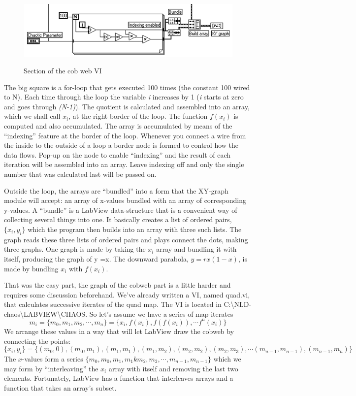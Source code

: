\documentclass{../lab}
\begin{document}
\begin{figure}[h]
    \centering
    \href{http://experimentationlab.berkeley.edu/sites/default/files/images/Nldimage082.gif}{\includegraphics[width=0.7\linewidth]{images/Nldimage082.png}}
    \caption{Section of the cob web VI}
    \label{fig:SectionOfCobWebVI}
\end{figure}

The big square is a for-loop that gets executed 100 times (the constant 100 wired to N). Each time through the loop the variable \emph{i} increases by 1 (\emph{i} starts at zero and goes through \emph{(N-1)}). The quotient is calculated and assembled into an array, which we shall call $x_i$, at the right border of the loop. The function $f(x_i)$ is computed and also accumulated. The array is accumulated by means of the ``indexing'' feature at the border of the loop. Whenever you connect a wire from the inside to the outside of a loop a border node is formed to control how the data flows. Pop-up on the node to enable ``indexing'' and the result of each iteration will be assembled into an array. Leave indexing off and only the single number that was calculated last will be passed on.

Outside the loop, the arrays are ``bundled'' into a form that the XY-graph module will accept: an array of x-values bundled with an array of corresponding y-values. A ``bundle'' is a LabView data-structure that is a convenient way of collecting several things into one. It basically creates a list of ordered pairs, $\{x_i,y_i\}$ which the program then builds into an array with three such lists. The graph reads these three lists of ordered pairs and plays connect the dots, making three graphs. One graph is made by taking the $x_i$ array and bundling it with itself, producing the graph of y =x. The downward parabola, $y = rx(1-x)$, is made by bundling $x_i$ with $f(x_i)$.

That was the easy part, the graph of the cobweb part is a little harder and requires some discussion beforehand. We've already written a VI, named quad.vi, that calculates successive iterates of the quad map. The VI is located in C:\textbackslash NLD-chaos\textbackslash LABVIEW\textbackslash CHAOS. So let's assume we have a series of map-iterates
\[
    m_i = \{m_0,m_1,m_2, \cdots ,m_n\} = \{x_i,f(x_i),f(f(x_i)),\cdots f^n(x_i)\}
\]
We arrange these values in a way that will let LabView draw the cobweb by connecting the points:
\[
    \{x_i,y_i\} = \{(m_0,0),(m_0,m_1),(m_1,m_1),(m_1,m_2),(m_2,m_2),(m_2,m_3),\cdots (m_{n-1},m_{n-1}),(m_{n-1},m_n)\}
\]
The $x$-values form a series $\{m_0,m_0,m_1,m_1km_2,m_2,\cdots,m_{n-1},m_{n-1}\}$ which we may form by ``interleaving'' the $x_i$ array with itself and removing the last two elements. Fortunately, LabView has a function that interleaves arrays and a function that takes an array's subset.
\end{document}
